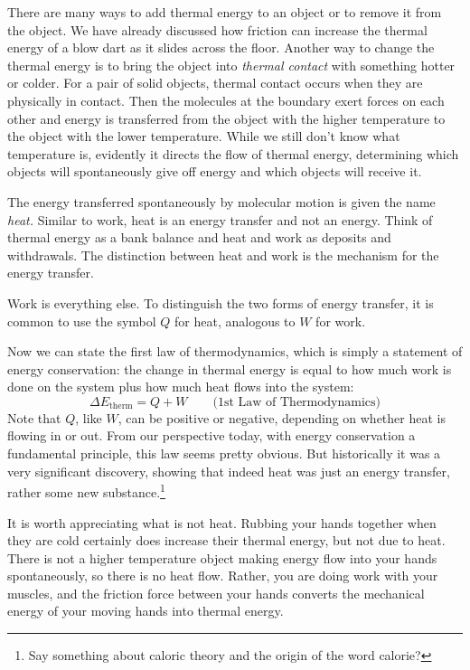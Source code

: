 There are many ways to add thermal energy to an object or to remove it
from the object.  We have already discussed how friction can increase
the thermal energy of a blow dart as it slides across the floor.
Another way to change the thermal energy is to bring the object into
{\it thermal contact} with something hotter or colder.  For a pair of
solid objects, thermal contact occurs when they are physically in
contact.  Then the molecules at the boundary exert forces on each
other and energy is transferred from the object with the higher
temperature to the object with the lower temperature.  While we still
don't know what temperature is, evidently it directs the flow of
thermal energy, determining which objects will spontaneously give off
energy and which objects will receive it.

The energy transferred spontaneously by molecular motion is given the
name {\it heat.}  Similar to work, heat is an energy transfer and not
an energy.  Think of thermal energy as a bank balance and heat and work
as deposits and withdrawals.  The distinction between heat and
work is the mechanism for the energy transfer.


\noindent Work is everything else.  To distinguish the two forms
of energy transfer, it is common to use the symbol $Q$ for heat, analogous
to $W$ for work.

Now we can state the first law of thermodynamics, which is simply a
statement of energy conservation: the change in thermal energy is
equal to how much work is done on the system plus how much heat flows
into the system:
\begin{equation}
\Delta E_\text{therm} = Q + W \qquad\text{(1st Law of Thermodynamics)}
\end{equation}
Note that $Q$, like $W$, can be positive or negative, depending on
whether heat is flowing in or out.
From our perspective today, with energy conservation a fundamental
principle, this law seems pretty obvious.  But historically it was a
very significant discovery, showing that indeed heat was just an
energy transfer, rather some new substance.\footnote{Say something
  about caloric theory and the origin of the word calorie?}

It is worth appreciating what is not heat.  Rubbing your hands
together when they are cold certainly does increase their thermal
energy, but not due to heat.  There is not a higher temperature object
making energy flow into your hands spontaneously, so there is no heat
flow.  Rather, you are doing work with your muscles, and the friction
force between your hands converts the mechanical energy of your moving
hands into thermal energy.

